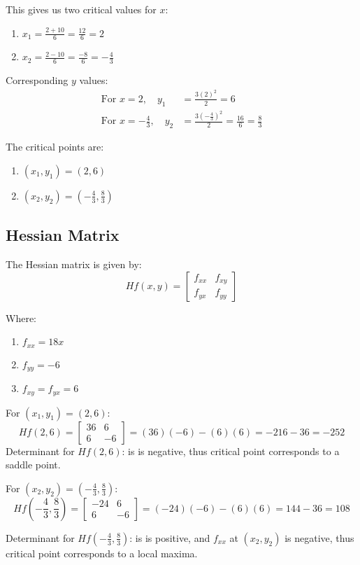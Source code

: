 \documentclass[letter,11pt]{article}
\begin{document}
This gives us two critical values for $x$:
\begin{enumerate}
    \item $x_1 = \frac{2 + 10}{6} = \frac{12}{6} = 2$
    \item $x_2 = \frac{2 - 10}{6} = \frac{-8}{6} = -\frac{4}{3}$
\end{enumerate}

Corresponding $y$ values:
\begin{align*}
    \text{For } x = 2, \quad y_1 &= \frac{3(2)^2}{2} = 6 \\
    \text{For } x = -\frac{4}{3}, \quad y_2 &= \frac{3\left(-\frac{4}{3}\right)^2}{2} = \frac{16}{6} = \frac{8}{3}
\end{align*}

The critical points are:
\begin{enumerate}
    \item $(x_1, y_1) = (2, 6)$
    \item $(x_2, y_2) = \left(-\frac{4}{3}, \frac{8}{3}\right)$
\end{enumerate}

\subsection*{Hessian Matrix}

The Hessian matrix is given by:
\[
Hf(x, y) = \begin{bmatrix}
f_{xx} & f_{xy} \\
f_{yx} & f_{yy}
\end{bmatrix}
\]

Where:
\begin{enumerate}[label = \roman*.]
    \item $f_{xx} = 18x$
    \item $f_{yy} = -6$
    \item $f_{xy} = f_{yx} = 6$
\end{enumerate}

For $(x_1, y_1) = (2, 6)$:
\[
Hf(2, 6) = \begin{bmatrix}
36 & 6 \\
6 & -6
\end{bmatrix} = (36)(-6) - (6)(6) = -216 - 36 = -252
\]
Determinant for $Hf(2, 6)$: is is negative, thus critical point corresponds to a saddle point.

For $(x_2, y_2) = \left(-\frac{4}{3}, \frac{8}{3}\right)$:
\[
Hf\left(-\frac{4}{3}, \frac{8}{3}\right) = \begin{bmatrix}
-24 & 6 \\
6 & -6
\end{bmatrix} = (-24)(-6) - (6)(6) = 144 - 36 = 108 
\]


Determinant for $Hf\left(-\frac{4}{3}, \frac{8}{3}\right)$: is is positive, and $f_{xx}$ at $(x_2,y_2)$ is negative, thus critical point corresponds to a local maxima.
\end{document}
